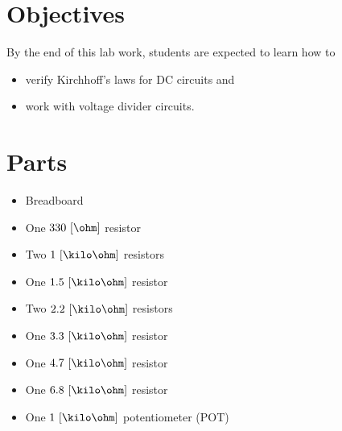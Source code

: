\section{Objectives}
By the end of this lab work, students are expected to learn how to 

\begin{itemize}
\item verify Kirchhoff's laws for DC circuits and
\item work with voltage divider circuits.
\end{itemize}

\section{Parts}
\label{sec:partsEx3}

\begin{itemize}
\item Breadboard    
\item One $330~[\ohm]$ resistor
\item Two $1~[\kilo\ohm]$ resistors
\item One $1.5~[\kilo\ohm]$ resistor 
\item Two $2.2~[\kilo\ohm]$ resistors
\item One $3.3~[\kilo\ohm]$ resistor
\item One $4.7~[\kilo\ohm]$ resistor
\item One $6.8~[\kilo\ohm]$ resistor
\item One $1~[\kilo\ohm]$ potentiometer (POT)

\end{itemize}  



